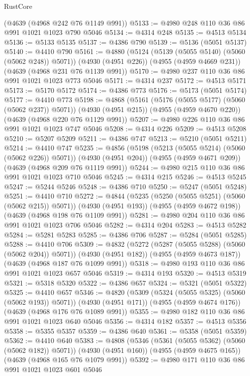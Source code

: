 \begin{lexlean}{RustCore}
\begin{coremodule}
    (@4639 (@4968 @242 @76 @1149 @991))
@5133 := @4980 @248 @110 @36 @86 @991 @1021 @1023 @790 @5046
@5134 := @4314 @248
@5135 := @4513 @5134
@5136 := @5133 @5135
@5137 := @4386 @790
@5139 := @5136 (@5051 @5137)
@5140 := @4410 @790
@5161 := @4880
    (@5124 (@5139 (@5055 @5140) (@5060 (@5062 @248)) @5071))
    (@4930 (@4951 @226))
    (@4955 (@4959 @4669 @231))
    (@4639 (@4968 @231 @76 @1139 @991))
@5170 := @4980 @237 @110 @36 @86 @991 @1021 @1023 @773 @5046
@5171 := @4314 @237
@5172 := @4513 @5171
@5173 := @5170 @5172
@5174 := @4386 @773
@5176 := @5173 (@5051 @5174)
@5177 := @4410 @773
@5198 := @4868
    (@5161 (@5176 (@5055 @5177) (@5060 (@5062 @237)) @5071))
    (@4930 (@4951 @215))
    (@4955 (@4959 @4670 @220))
    (@4639 (@4968 @220 @76 @1129 @991))
@5207 := @4980 @226 @110 @36 @86 @991 @1021 @1023 @747 @5046
@5208 := @4314 @226
@5209 := @4513 @5208
@5210 := @5207 @5209
@5211 := @4386 @747
@5213 := @5210 (@5051 @5211)
@5214 := @4410 @747
@5235 := @4856
    (@5198 (@5213 (@5055 @5214) (@5060 (@5062 @226)) @5071))
    (@4930 (@4951 @204))
    (@4955 (@4959 @4671 @209))
    (@4639 (@4968 @209 @76 @1119 @991))
@5244 := @4980 @215 @110 @36 @86 @991 @1021 @1023 @710 @5046
@5245 := @4314 @215
@5246 := @4513 @5245
@5247 := @5244 @5246
@5248 := @4386 @710
@5250 := @5247 (@5051 @5248)
@5251 := @4410 @710
@5272 := @4844
    (@5235 (@5250 (@5055 @5251) (@5060 (@5062 @215)) @5071))
    (@4930 (@4951 @193))
    (@4955 (@4959 @4672 @198))
    (@4639 (@4968 @198 @76 @1109 @991))
@5281 := @4980 @204 @110 @36 @86 @991 @1021 @1023 @706 @5046
@5282 := @4314 @204
@5283 := @4513 @5282
@5284 := @5281 @5283
@5285 := @4386 @706
@5287 := @5284 (@5051 @5285)
@5288 := @4410 @706
@5309 := @4832
    (@5272 (@5287 (@5055 @5288) (@5060 (@5062 @204)) @5071))
    (@4930 (@4951 @182))
    (@4955 (@4959 @4673 @187))
    (@4639 (@4968 @187 @76 @1099 @991))
@5318 := @4980 @193 @110 @36 @86 @991 @1021 @1023 @657 @5046
@5319 := @4314 @193
@5320 := @4513 @5319
@5321 := @5318 @5320
@5322 := @4386 @657
@5324 := @5321 (@5051 @5322)
@5325 := @4410 @657
@5346 := @4820
    (@5309 (@5324 (@5055 @5325) (@5060 (@5062 @193)) @5071))
    (@4930 (@4951 @171))
    (@4955 (@4959 @4674 @176))
    (@4639 (@4968 @176 @76 @1089 @991))
@5355 := @4980 @182 @110 @36 @86 @991 @1021 @1023 @640 @5046
@5356 := @4314 @182
@5357 := @4513 @5356
@5358 := @5355 @5357
@5359 := @4386 @640
@5361 := @5358 (@5051 @5359)
@5362 := @4410 @640
@5383 := @4808
    (@5346 (@5361 (@5055 @5362) (@5060 (@5062 @182)) @5071))
    (@4930 (@4951 @160))
    (@4955 (@4959 @4675 @165))
    (@4639 (@4968 @165 @76 @1079 @991))
@5392 := @4980 @171 @110 @36 @86 @991 @1021 @1023 @601 @5046

\end{coremodule}
\end{lexlean}
